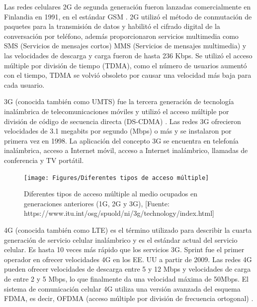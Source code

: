 Las redes celulares 2G de segunda generación fueron lanzadas comercialmente en Finlandia en 1991, en el estándar GSM \parencite{Nair2018}. 2G utilizó el método de conmutación de paquetes para la transmisión de datos y habilitó el cifrado digital de la conversación por teléfono, además proporcionaron servicios multimedia como SMS (Servicios de mensajes cortos) MMS (Servicios de mensajes multimedia) y las velocidades de descarga y carga fueron de hasta 236 Kbps. Se utilizó el acceso múltiple por división de tiempo (TDMA), como el número de usuarios aumentó con el tiempo, TDMA se volvió obsoleto por causar una velocidad más baja para cada usuario.\newline

3G (conocida también como UMTS) fue la tercera generación de tecnología inalámbrica de telecomunicaciones móviles y utilizó el acceso múltiple por división de código de secuencia directa (DS-CDMA) \parencite{Nair2018}. Las redes 3G ofrecieron velocidades de 3.1 megabits por segundo (Mbps) o más y se instalaron por primera vez en 1998. La aplicación del concepto 3G se encuentra en telefonía inalámbrica, acceso a Internet móvil, acceso a Internet inalámbrico, llamadas de conferencia y TV portátil.\newline

\begin{figure}[th]
\centering
\texttt{[image: Figures/Diferentes tipos de acceso múltiple]}
\decoRule
\caption[Diferentes tipos de acceso múltiple al medio ocupados en generaciones anteriores (1G, 2G y 3G)]{Diferentes tipos de acceso múltiple al medio ocupados en generaciones anteriores (1G, 2G y 3G), [Fuente: https://www.itu.int/osg/spuold/ni/3g/technology/index.html]}
\label{fig:MAs}
\end{figure}

4G (conocida también como LTE) es el término utilizado para describir la cuarta generación de servicio celular inalámbrico y es el estándar actual del servicio celular. Es hasta 10 veces más rápido que los servicios 3G. Sprint fue el primer operador en ofrecer velocidades 4G en los EE. UU a partir de 2009. Las redes 4G pueden ofrecer velocidades de descarga entre 5 y 12 Mbps y velocidades de carga de entre 2 y 5 Mbps, lo que finalmente da una velocidad máxima de 50Mbps. El sistema de comunicación celular 4G utiliza una versión avanzada del esquema FDMA, es decir, OFDMA (acceso múltiple por división de frecuencia ortogonal) \parencite{Nair2018}.


